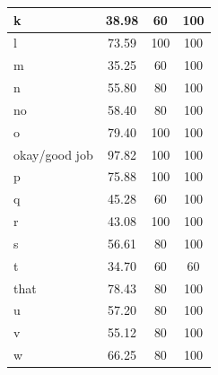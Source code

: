\documentclass[journal]{./IEEE/IEEEtran}
\begin{document}
\begin{table}[ht!]
\begin{tabular}{|l|c|c|c|}
k                                      & 38.98                   & 60                      & 100                     \\ \hline
l                                      & 73.59                   & 100                     & 100                     \\ \hline
m                                      & 35.25                   & 60                      & 100                     \\ \hline
n                                      & 55.80                   & 80                      & 100                     \\ \hline
no                                     & 58.40                   & 80                      & 100                     \\ \hline
o                                      & 79.40                   & 100                     & 100                     \\ \hline
okay/good job                        & 97.82                   & 100                     & 100                     \\ \hline
p                                      & 75.88                   & 100                     & 100                     \\ \hline
q                                      & 45.28                   & 60                      & 100                     \\ \hline
r                                      & 43.08                   & 100                     & 100                     \\ \hline
s                                      & 56.61                   & 80                      & 100                     \\ \hline
t                                      & 34.70                   & 60                      & 60                      \\ \hline
that                                   & 78.43                   & 80                      & 100                     \\ \hline
u                                      & 57.20                   & 80                      & 100                     \\ \hline
v                                      & 55.12                   & 80                      & 100                     \\ \hline
w                                      & 66.25                   & 80                      & 100                     \\ \hline

\end{tabular}
\end{table}
\end{document}
